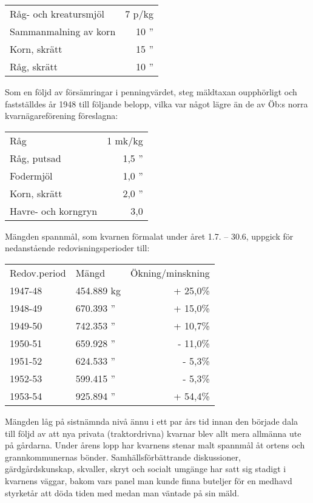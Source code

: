 \begin{center}
  \begin{tabular}{l r}
    \hline
    Råg- och kreatursmjöl & 7  p/kg \\
    Sammanmalning av korn	&	10 '' \\
    Korn, skrätt &	15 '' \\
    Råg, skrätt	&	10 '' \\
    \hline
  \end{tabular}
\end{center}

Som en följd av försämringar i penningvärdet, steg mäldtaxan oupphörligt och fastställdes år 1948 till följande belopp, vilka var något lägre än de av Öb:s norra kvarnägareförening föreslagna:

\begin{center}
  \begin{tabular}{l r}
    \hline
    Råg & 1 mk/kg \\
    Råg, putsad & 1,5 '' \\
    Fodermjöl & 1,0 '' \\
    Korn, skrätt & 2,0 '' \\
    Havre- och korngryn & 3,0 \\
    \hline
  \end{tabular}
\end{center}

Mängden spannmål, som kvarnen förmalat under året 1.7. – 30.6, uppgick för nedanstående redovisningsperioder till:
\begin{center}
  \begin{tabular}{l l r}
    \hline
    Redov.period & Mängd & Ökning/minskning \\
    1947-48	&	454.889 kg & + 25,0\% \\
    1948-49	&	670.393 '' & + 15,0\% \\
    1949-50	&	742.353 '' & + 10,7\% \\
    1950-51	&	659.928 '' & - 11,0\% \\
    1951-52	&	624.533 '' & -  5,3\% \\
    1952-53	&	599.415 '' & -  5,3\% \\
    1953-54	&	925.894 '' & + 54,4\% \\
    \hline
  \end{tabular}
\end{center}

Mängden låg på sistnämnda nivå ännu i ett par års tid innan den började dala till följd av att nya privata (traktordrivna) kvarnar blev allt mera allmänna ute på gårdarna. Under årens lopp har kvarnens stenar malt spannmål åt ortens och grannkommunernas bönder. Samhällsförbättrande diskussioner, gärdgårdskunskap, skvaller, skryt och socialt umgänge har satt sig stadigt i kvarnens väggar, bakom vars panel man kunde finna buteljer för en medhavd styrketår att döda tiden med medan man väntade på sin mäld.

